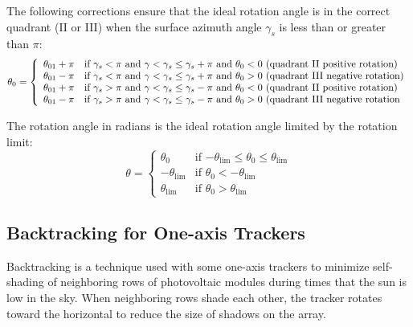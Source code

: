 \documentclass[12pt,letterpaper]{article}
\begin{document}
The following corrections ensure that the ideal rotation angle is in the correct quadrant (II or III) when the surface azimuth angle $\gamma_s$ is less than or greater than $\pi$:
\begin{equation}
\theta_0 = \left\{
\begin{array}{ll}
\theta_{\mathrm{01}} + \pi & \text{if $\gamma_s < \pi$ and $\gamma < \gamma_s \leq \gamma_s + \pi$ and $\theta_0 < 0$ (quadrant II positive rotation)} \notag\\
\theta_{\mathrm{01}} - \pi & \text{if $\gamma_s < \pi$ and $\gamma < \gamma_s \leq \gamma_s + \pi$ and $\theta_0 > 0$ (quadrant III negative rotation)} \notag\\
\theta_{\mathrm{01}} + \pi & \text{if $\gamma_s > \pi$ and $\gamma < \gamma_s \leq \gamma_s - \pi$ and $\theta_0 < 0$ (quadrant II positive rotation)} \notag\\
\theta_{\mathrm{01}} - \pi & \text{if $\gamma_s > \pi$ and $\gamma < \gamma_s \leq \gamma_s - \pi$ and $\theta_0 > 0$ (quadrant III negative rotation}
\end{array}
\right.
\end{equation}

The rotation angle in radians is the ideal rotation angle limited by the rotation limit:
\begin{equation}\label{eqn-rot1x}
\theta = \left\{
\begin{array}{ll}
\theta_0 & \text{if $-\theta_{\mathrm{lim}} \leq \theta_0 \leq \theta_{\mathrm{lim}}$}\\
-\theta_{\mathrm{lim}} & \text{if $\theta_0 < -\theta_{\mathrm{lim}}$}\\
\theta_{\mathrm{lim}} &  \text{if $\theta_0 > \theta_{\mathrm{lim}}$}
\end{array}
\right.
\end{equation}

\subsection{Backtracking for One-axis Trackers}\label{sec-backtrack1x}

Backtracking is a technique used with some one-axis trackers to minimize self-shading of neighboring rows of photovoltaic modules during times that the sun is low in the sky. When neighboring rows shade each other, the tracker rotates toward the horizontal to reduce the size of shadows on the array.
\end{document}
